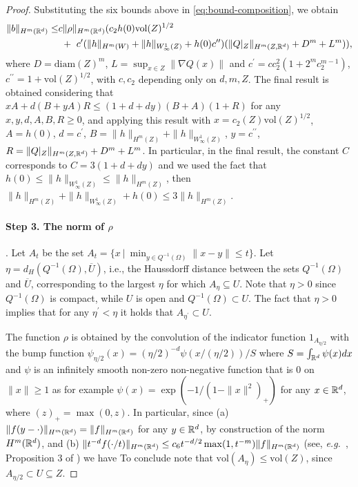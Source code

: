 \begin{proof}
{}
Substituting the six bounds above in \cref{eq:bound-composition}, we obtain
\begin{align*}
\|b\|_{H^m(\mathbb R^d)} \leq &c \|\rho\|_{H^m(\mathbb R^d)}(c_2 h(0) \textrm{vol}(Z)^{1/2}\\
& ~+~ c^\prime ( \|h\|_{H^m(W)} + \|h\|_{W^1_\infty(Z)} + h(0) c^{\prime\prime})(\|Q|_Z\|_{H^m(Z, \mathbb R^d)} + D^m + L^m)),
\end{align*}
where $D =\textrm{diam}(Z)^m $, $L = \sup_{x \in Z} \|\nabla Q (x)\|$ and $c^\prime = c c_2^2 (1 + 2^m c_2^{m-1})$, $c^{\prime\prime}=1+\textrm{vol}(Z)^{1/2}$, with $c, c_2$ depending only on $d, m, Z$.
The final result is obtained considering that $x A + d (B + y A) R \leq (1+ d + d y)(B+A)(1+R)$ for any $x,y,d,A,B, R \geq 0$, and applying this result with $x=c_2(Z)\textrm{vol}(Z)^{1/2}$, $A = h(0)$, $d = c^\prime$, $B = \|h\|_{H^m(Z)} + \|h\|_{W^1_\infty(Z)}$, $y= c^{\prime \prime}$, $R = \|Q|_Z\|_{H^m(Z, \mathbb R^d)} + D^m + L^m$. In particular, in the final result, the constant $C$ corresponds to $C = 3(1+ d + d y)$ and we used the fact that $h(0) \leq \|h\|_{W^1_\infty(Z)} \leq \|h\|_{H^m(Z)}$, then $\|h\|_{H^m(Z)} + \|h\|_{W^1_\infty(Z)} + h(0) \leq 3 \|h\|_{H^m(Z)}$.


\paragraph{Step 3. The norm of $\rho$}.  Let $A_{t}$ be the set $A_{t} = \{x ~|~ \min_{y \in Q^{-1}(\Omega)} \|x-y\| \leq t\}$. Let $\eta = d_H(Q^{-1}(\Omega), \overline{U})$, i.e., the Haussdorff distance between the sets $Q^{-1}(\Omega)$ and $\overline{U}$, corresponding to the largest $\eta$ for which $A_\eta \subseteq U$. Note that $\eta > 0$ since $Q^{-1}(\Omega)$ is compact, while $U$ is open and $Q^{-1}(\Omega) \subset U$. The fact that $\eta > 0$ implies that for any $\eta^\prime < \eta$ it holds that $A_{\eta^\prime} \subset U$.

The function $\rho$ is obtained by the convolution of the indicator function $1_{A_{\eta/2}}$ with the bump function $\psi_{\eta/2}(x) =  (\eta/2)^{-d} \psi(x/(\eta/2))/S$ where $S = \int_{\mathbb R^d} \psi(x) dx$ and $\psi$ is an infinitely smooth non-zero non-negative function that is $0$ on $\|x\| \geq 1$ as for example $\psi(x) = \exp(-1/(1-\|x\|^2)_+)$ for any $x \in \mathbb R^d$, where $(z)_+ = \max(0,z)$. In particular, since (a) $\|f(y-\cdot)\|_{H^m(\mathbb R^d)} = \|f\|_{H^m(\mathbb R^d)}$ for any $y \in \mathbb R^d$, by construction of the norm $H^m(\mathbb R^d)$, and (b) $\|t^{-d} f(\cdot/t)\|_{H^m(\mathbb R^d)} \leq c_6 t^{-d/2} \max(1,t^{-m}) \|f\|_{H^m(\mathbb R^d)}$ (see, \emph{e.g.\ }, Proposition 3 of \citealp{runst2011sobolev}) we have
To conclude note that $\textrm{vol}(A_\eta) \leq \textrm{vol}(Z)$, since $A_{\eta/2} \subset U \subseteq Z$.
\end{proof}


